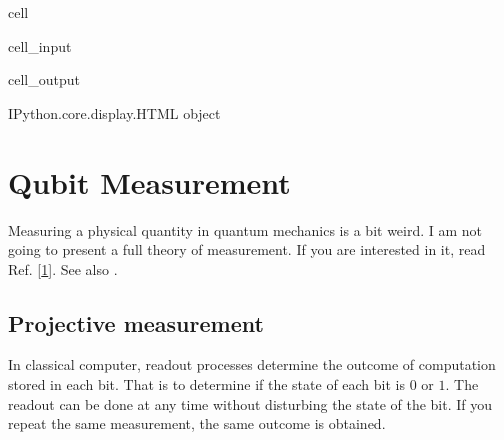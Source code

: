 \documentclass[letterpaper,10pt,english]{jupyterBook}
\begin{document}
\begin{sphinxuseclass}{cell}\begin{sphinxVerbatimInput}

\begin{sphinxuseclass}{cell_input}
\begin{sphinxVerbatim}[commandchars=\\\{\}]
\end{sphinxVerbatim}

\end{sphinxuseclass}\end{sphinxVerbatimInput}
\begin{sphinxVerbatimOutput}

\begin{sphinxuseclass}{cell_output}
\begin{sphinxVerbatim}[commandchars=\\\{\}]
\PYGZlt{}IPython.core.display.HTML object\PYGZgt{}
\end{sphinxVerbatim}

\end{sphinxuseclass}\end{sphinxVerbatimOutput}

\end{sphinxuseclass}
\sphinxstepscope


\section{Qubit Measurement}
\label{\detokenize{qubit/measurement:qubit-measurement}}\label{\detokenize{qubit/measurement:sec-qubit-measurement}}\label{\detokenize{qubit/measurement::doc}}
\sphinxAtStartPar
Measuring a physical quantity in quantum mechanics is a bit weird.  I am not going to present a full theory of measurement. If you are interested in it, read Ref. {[}\hyperlink{cite.references:id4}{1}{]}. See also .


\subsection{Projective measurement}
\label{\detokenize{qubit/measurement:projective-measurement}}
\sphinxAtStartPar
In classical computer, readout processes determine the outcome of computation stored in each bit.  That is to determine if the state of each bit is \(0\) or \(1\). The readout can be done at any time without disturbing the state of the bit.  If you repeat the same measurement, the same outcome is obtained.
\end{document}
